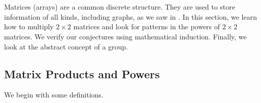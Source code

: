 \section{\secmatrix}
\label{sec_matrix}

Matrices (arrays) are a common discrete structure. They are used to store information of all kinds, including graphs, as we saw in .  In this section, we learn how to multiply $2 \times 2$ matrices and look for patterns in the powers of $2 \times 2$ matrices.  We verify our conjectures using mathematical induction. Finally, we look at the abstract concept of a group.


\newcommand{\submatpowers}{Matrix Products and Powers}
\subsection{\submatpowers}
\label{sub_matrix_powers}

We begin with some definitions.

